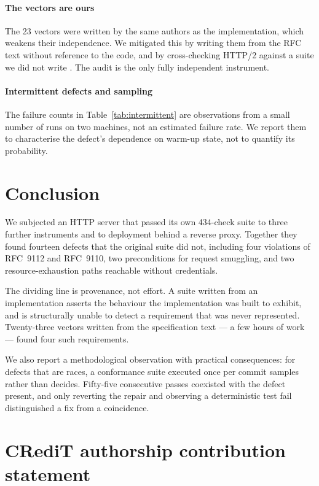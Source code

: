 \documentclass[preprint,12pt]{elsarticle}
\begin{document}
\paragraph{The vectors are ours}
The 23 vectors were written by the same authors as the implementation, which
weakens their independence. We mitigated this by writing them from the RFC text
without reference to the code, and by cross-checking HTTP/2 against a suite we
did not write \cite{h2spec}. The audit is the only fully independent instrument.

\paragraph{Intermittent defects and sampling}
The failure counts in Table~\ref{tab:intermittent} are observations from a
small number of runs on two machines, not an estimated failure rate. We report
them to characterise the defect's dependence on warm-up state, not to quantify
its probability.

\section{Conclusion}
\label{sec:conclusion}

We subjected an HTTP server that passed its own 434-check suite to three further
instruments and to deployment behind a reverse proxy. Together they found
fourteen defects that the original suite did not, including four violations of
RFC~9112 and RFC~9110, two preconditions for request smuggling, and two
resource-exhaustion paths reachable without credentials.

The dividing line is provenance, not effort. A suite written from an
implementation asserts the behaviour the implementation was built to exhibit,
and is structurally unable to detect a requirement that was never represented.
Twenty-three vectors written from the specification text --- a few hours of work
--- found four such requirements.

We also report a methodological observation with practical consequences: for
defects that are races, a conformance suite executed once per commit samples
rather than decides. Fifty-five consecutive passes coexisted with the defect
present, and only reverting the repair and observing a deterministic test fail
distinguished a fix from a coincidence.

\section*{CRediT authorship contribution statement}
\end{document}
